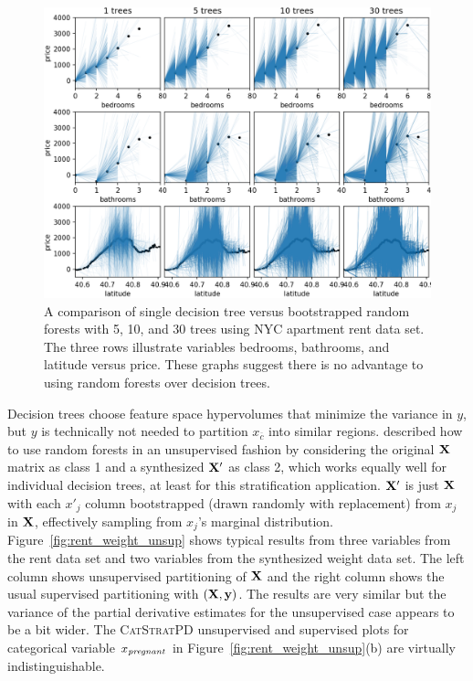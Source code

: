 \documentclass[12pt]{article}
\newcommand{\figref}[1]{Figure~\ref{#1}}
\newcommand{\cspd}{\fontfamily{cmr}\textsc{\small CatStratPD}}
\newcommand{\xnc}{$x_{\overline{c}}$}
\begin{document}
\begin{figure}[htbp]
\begin{center}
\includegraphics[scale=0.55]{images/rent_ntrees.png}
\caption{A comparison of single decision tree versus bootstrapped random forests with 5, 10, and 30 trees using NYC apartment rent data set. The three rows illustrate variables bedrooms, bathrooms, and latitude versus price. These graphs suggest there is no advantage to using random forests over decision trees.}
\label{fig:rent_ntrees}
\end{center}
\end{figure}

Decision trees choose feature space hypervolumes that minimize the variance in $y$, but $y$ is technically not needed to partition \xnc{} into similar regions. \cite{RFunsup} described how to use random forests in an unsupervised fashion by considering the original $\bf X$ matrix as class 1 and a synthesized $\bf X'$ as class 2, which works equally well for individual decision trees, at least for this stratification application. $\bf X'$ is just $\bf X$ with each $x'_j$ column bootstrapped (drawn randomly with replacement) from $x_j$ in $\bf X$, effectively sampling from $x_j$'s marginal distribution. \figref{fig:rent_weight_unsup} shows typical results from three variables from the rent data set and two variables from the synthesized weight data set.  The left column shows unsupervised partitioning of $\bf X$ and the right column shows the usual supervised partitioning with $(\bf X, y)$. The results are very similar but the variance of the partial derivative estimates for the unsupervised case appears to be a bit wider. The \cspd{} unsupervised and supervised plots for categorical variable $x_{\it pregnant}$ in \figref{fig:rent_weight_unsup}(b) are virtually indistinguishable. 
\end{document}

